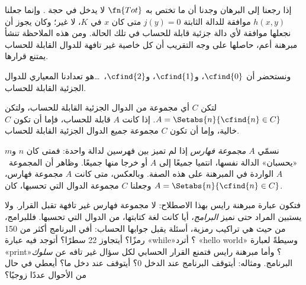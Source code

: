 \documentclass[../../../include/open-logic-section]{subfiles}
\begin{document}

إذا رجعنا إلى البرهان وجدنا أن ما تختص به $\fn{Tot}$ لا يدخل
في حجة . وإنما جعلنا $h(x,y)$ موافقة
للدالة الثابتة $j(y)=0$ متى كان $x$ في $K$، لا غير؛ وكان
يجوز أن نجعلها موافقة لأي دالة جزئية قابلة
للحساب في تلك الحالة. ومن هذه الملاحظة تنشأ مبرهنة أعم، حاصلها على وجه
التقريب أن كل خاصية غير تافهة للدوال القابلة للحساب
يمتنع قرارها.

ونستحضر أن $\cfind{0}$، و$\cfind{1}$، و$\cfind{2}$،~\dots هو تعدادنا
المعياري للدوال الجزئية القابلة للحساب.

\begin{thm}
  لتكن $C$ أي مجموعة من الدوال الجزئية القابلة للحساب، ولتكن $A =
  \Setabs{n}{\cfind{n} \in C}$. إذا كانت $A$ قابلة للحساب، فإما أن
  تكون $C$ خالية، وإما أن تكون $C$ مجموعة جميع الدوال الجزئية
  القابلة للحساب.
\end{thm}

نسمّي $A$ \emph{مجموعة فهارس} إذا لم تميز بين فهرسين لدالة واحدة:
فمتى كان $n$ و$m$ «يحسبان» الدالة نفسها، انتميا جميعًا
إلى $A$ أو خرجا منها جميعًا. وظاهر أن
المجموعة~$A$ الواردة في المبرهنة على هذه الصفة. وبالعكس، متى كانت $A$
مجموعة فهارس، وجعلنا $C$ مجموعة الدوال التي تحسبها، كان
$A = \Setabs{n}{\cfind{n} \in C}$.

\begin{explain}
فتكون عبارة مبرهنة رايس بهذا الاصطلاح: لا مجموعة فهارس غير تافهة
تقبل القرار. ولا يستبين المراد حتى نميز
\emph{البرامج}، أيا كانت لغة كتابتها، من الدوال
التي تحسبها. فللبرامج، من حيث هي تراكيب رمزية،
أسئلة يقبل جوابها الحساب: أفي البرنامج أكثر من 150 رمزًا؟ أيتجاوز 22
سطرًا؟ أتوجد فيه عبارة «while»؟ أترد «hello world» وسيطةً
لعبارة «print»؟ وأما مبرهنة رايس فتمنع القرار الحسابي لكل سؤال غير تافه عن
\emph{سلوك} البرنامج. ومثاله: أيتوقف
البرنامج عند الدخل $0$؟ أيتوقف عند دخل ما؟ أيعطي في حال من الأحوال عددًا زوجيًا؟
\end{explain}
\end{document}
